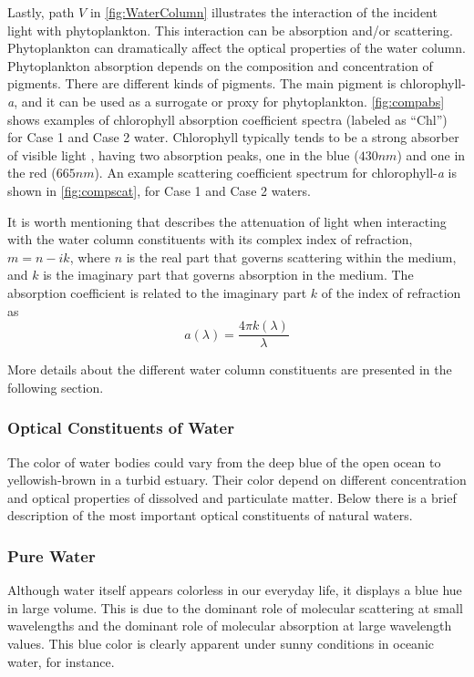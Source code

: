 Lastly, path $V$ in \autoref{fig:WaterColumn} illustrates the interaction of the incident light with phytoplankton. This interaction can be absorption and/or scattering. Phytoplankton can dramatically affect the optical properties of the water column. Phytoplankton absorption depends on the composition and concentration of pigments. There are different kinds of pigments. The main pigment is chlorophyll-{\it a}, and it can be used as a surrogate or proxy for phytoplankton. \autoref{fig:compabs} shows examples of chlorophyll absorption coefficient spectra (labeled as ``Chl'') for Case 1 and Case 2 water. Chlorophyll typically tends to be a strong absorber of visible light \citep{Mobley1994}, having two absorption peaks, one in the blue ($430nm$) and one in the red ($665nm$). An example scattering coefficient spectrum for chlorophyll-{\it a} is shown in \autoref{fig:compscat}, for Case 1 and Case 2 waters.

It is worth mentioning that \citet{Mobley1994} describes the attenuation of light when interacting with the water column constituents with its complex index of refraction, $m=n-ik$, where $n$ is the real part that governs scattering within the medium, and $k$ is the imaginary part that governs absorption in the medium. The absorption coefficient is related to the imaginary part $k$ of the index of refraction as \citep{Kerker1969}
\begin{equation}
  a(\lambda)=\frac{4\pi k(\lambda)}{\lambda}
\end{equation}

More details about the different water column constituents are presented in the following section.

\subsubsection{Optical Constituents of Water}
The color of water bodies could vary from the deep blue of the open ocean to yellowish-brown in a turbid estuary. Their color depend on different concentration and optical properties of dissolved and particulate matter. Below there is a brief description of the most important optical constituents of natural waters.
\subsubsection*{Pure Water}
 Although water itself appears colorless in our everyday life, it displays a blue hue in large volume. This is due to the dominant role of molecular scattering at small wavelengths and the dominant role of molecular absorption at large wavelength values. This blue color is clearly apparent under sunny conditions in oceanic water, for instance.
